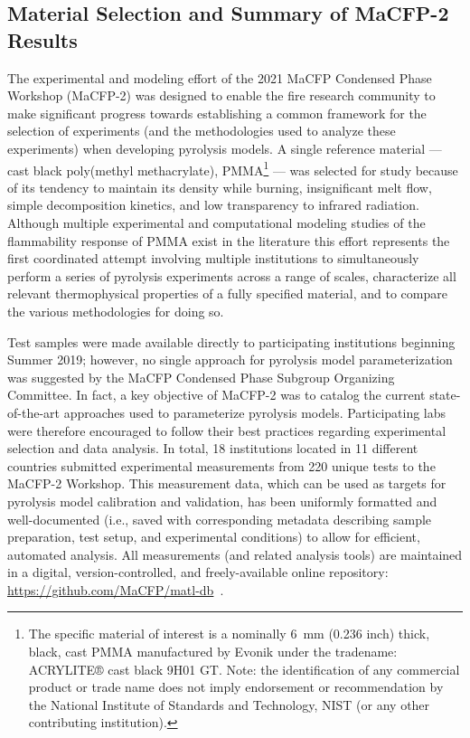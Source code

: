 \documentclass[12pt]{article}
\begin{document}
\subsection{Material Selection and Summary of MaCFP-2 Results}
The experimental and modeling effort of the 2021 MaCFP Condensed Phase Workshop (MaCFP-2) was designed to enable the fire research community to make significant progress towards establishing a common framework for the selection of experiments (and the methodologies used to analyze these experiments) when developing pyrolysis models. A single reference material --- cast black poly(methyl methacrylate), PMMA\footnote{The specific material of interest is a nominally 6~mm (0.236 inch) thick, black, cast PMMA manufactured by Evonik under the tradename: ACRYLITE® cast black 9H01 GT. Note: the identification of any commercial product or trade name does not imply endorsement or recommendation by the National Institute of Standards and Technology, NIST (or any other contributing institution).} --- was selected for study because of its tendency to maintain its density while burning, insignificant melt flow, simple decomposition kinetics, and low transparency to infrared radiation. Although multiple experimental \cite{fiola2020comparison,kashiwagi1982study,hirata1985thermal,tewarson1992fire,rhodes1996burning} and computational modeling studies of the flammability response of PMMA exist in the literature \cite{fiola2020comparison,consalvi2008numerical,leventon2015flame,fukumoto2018large} this effort represents the first coordinated attempt involving multiple institutions to simultaneously perform a series of pyrolysis experiments across a range of scales, characterize all relevant thermophysical properties of a fully specified material, and to compare the various methodologies for doing so.

Test samples were made available directly to participating institutions beginning Summer 2019; however, no single approach for pyrolysis model parameterization was suggested by the MaCFP Condensed Phase Subgroup Organizing Committee. In fact, a key objective of MaCFP-2 was to catalog the current state-of-the-art approaches used to parameterize pyrolysis models. Participating labs were therefore encouraged to follow their best practices regarding experimental selection and data analysis. In total, 18 institutions located in 11 different countries submitted experimental measurements from 220 unique tests to the MaCFP-2 Workshop. This measurement data, which can be used as targets for pyrolysis model calibration and validation, has been uniformly formatted and well-documented (i.e., saved with corresponding metadata describing sample preparation, test setup, and experimental conditions) to allow for efficient, automated analysis. All measurements (and related analysis tools) are maintained in a digital, version-controlled, and freely-available online repository: \url{https://github.com/MaCFP/matl-db}~\cite{MaCFP-cond-db}.
\end{document}

